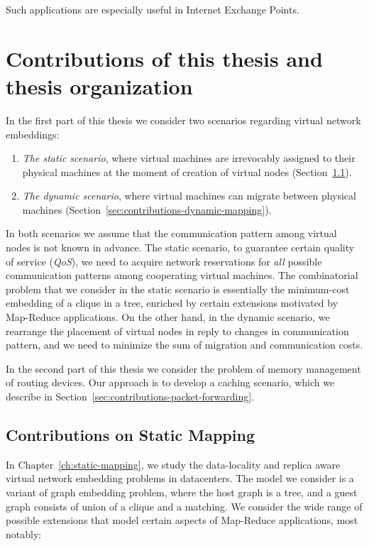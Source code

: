 Such applications are especially useful in Internet Exchange Points.

\section{Contributions of this thesis and thesis organization}

In the first part of this thesis we consider two scenarios regarding virtual network embeddings:
\begin{enumerate}
  \item \emph{The static scenario}, where virtual machines are irrevocably assigned to their physical machines at the moment of creation of virtual nodes (Section~\ref{sec:contributions-static-mapping}).
  \item \emph{The dynamic scenario}, where virtual machines can migrate between physical machines (Section~\ref{sec:contributions-dynamic-mapping}).
\end{enumerate}
In both scenarios we assume that the communication pattern among virtual nodes is not known in advance.
The static scenario, to guarantee certain quality of service (\emph{QoS}), we need to acquire network reservations for \emph{all} possible communication patterns among cooperating virtual machines.
The combinatorial problem that we consider in the static scenario is essentially the minimum-cost embedding of a clique in a tree, enriched by certain extensions motivated by Map-Reduce applications.
On the other hand, in the dynamic scenario, we rearrange the placement of virtual nodes in reply to changes in communication pattern, and we need to minimize the sum of migration and communication costs.

In the second part of this thesis we consider the problem of memory management of routing devices.
Our approach is to develop a caching scenario, which we describe in Section~\ref{sec:contributions-packet-forwarding}.

\subsection{Contributions on Static Mapping}
\label{sec:contributions-static-mapping}

In Chapter~\ref{ch:static-mapping}, we study the data-locality and replica aware virtual network embedding problems in datacenters.
The model we consider is a variant of graph embedding problem, where the host graph is a tree, and a guest graph consists of union of a clique and a matching.
We consider the wide range of possible extensions that model certain aspects of Map-Reduce applications, most notably:

